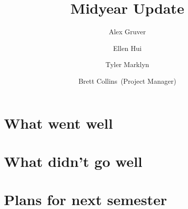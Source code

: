 \documentclass{hmcclinic}
\title{Midyear Update}
\author{Alex Gruver \and Ellen Hui \and Tyler Marklyn \and Brett Collins~(Project Manager)}
\begin{document}





\maketitle

\mainmatter




\section*{What went well}

\section*{What didn't go well}

\section*{Plans for next semester}
\end{document}
